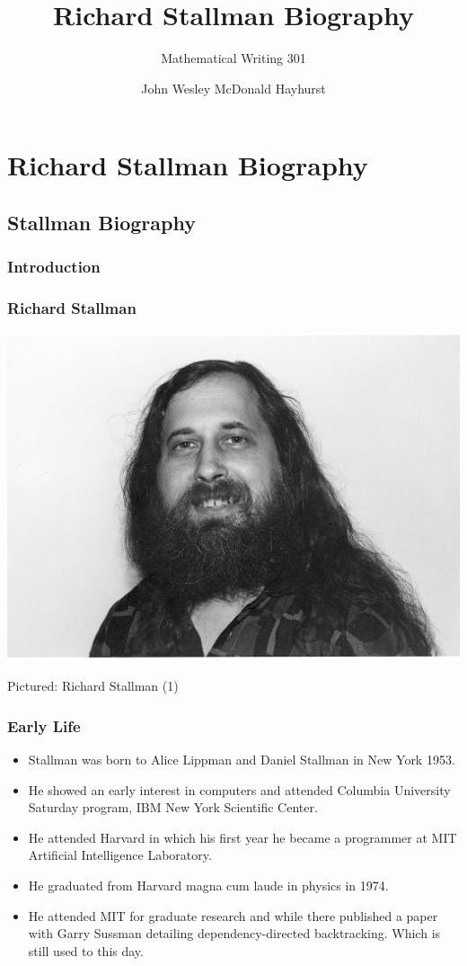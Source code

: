 \documentclass{beamer}
\title[Stallman Biography]{Richard Stallman Biography}
\date{}
\subtitle{Mathematical Writing 301}
\author[Hayhurst]{John Wesley McDonald Hayhurst}
\begin{document}
\section{Richard Stallman Biography}
\subsection{Stallman Biography}
\begin{frame}\frametitle{Introduction}
\maketitle
\end{frame}

\begin{frame}\frametitle{Richard Stallman}
  \includegraphics[scale=.6, center]{stallman1.jpg} \\
  \begin{center}
    \small{Pictured: Richard Stallman (1)}
  \end{center}
\end{frame}


\begin{frame}\frametitle{Early Life}
  \begin{itemize}
    \item Stallman was born to Alice Lippman and Daniel Stallman in New York 1953.
    \item He showed an early interest in computers and attended Columbia University Saturday program, IBM New York Scientific Center.
    \item He attended Harvard in which his first year he became a programmer at MIT Artificial Intelligence Laboratory.
    \item He graduated from Harvard magna cum laude in physics in 1974.
    \item He attended MIT for graduate research and while there published a paper with Garry Sussman detailing dependency-directed backtracking. Which is still used to this day.
  \end{itemize}
\end{frame}
\end{document}
